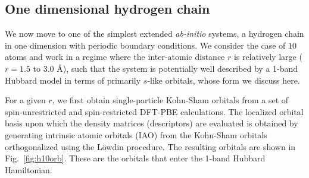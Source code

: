 \subsection{One dimensional hydrogen chain}
We now move to one of the simplest extended \emph{ab-initio} systems, a hydrogen chain in one dimension with periodic boundary conditions. 
We consider the case of $10$ atoms and work in a regime where the inter-atomic distance $r$ is 
relatively large ($r=1.5$ to $3.0$ \AA), such that the system is potentially well described by a 1-band Hubbard model 
in terms of primarily $s$-like orbitals, whose form we discuss here. 


For a given $r$, we first obtain single-particle Kohn-Sham orbitals from a set of spin-unrestricted and 
spin-restricted DFT-PBE calculations. The localized orbital basis upon which the density matrices (descriptors) 
are evaluated is obtained by generating intrinsic atomic orbitals (IAO) from the Kohn-Sham orbitals 
orthogonalized using the L\"owdin procedure. The resulting orbitals are shown in Fig.~\ref{fig:h10orb}. These are the orbitals that enter the 1-band Hubbard Hamiltonian. 


